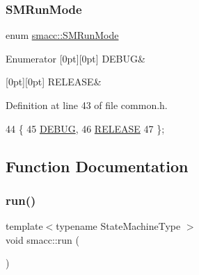 \subsubsection{\texorpdfstring{S\+M\+Run\+Mode}{SMRunMode}}
{\footnotesize\ttfamily enum \hyperlink{namespacesmacc_a3e4f79486ea6ea6342dd3c712d16a4f6}{smacc\+::\+S\+M\+Run\+Mode}\hspace{0.3cm}{\ttfamily [strong]}}

\begin{DoxyEnumFields}{Enumerator}
[0pt][0pt]{}\mbox{\label{namespacesmacc_a3e4f79486ea6ea6342dd3c712d16a4f6adc30ec20708ef7b0f641ef78b7880a15}} 
D\+E\+B\+UG&\\
\hline

[0pt][0pt]{}\mbox{\label{namespacesmacc_a3e4f79486ea6ea6342dd3c712d16a4f6a7d649ef069df9885e382417c79f3d5cd}} 
R\+E\+L\+E\+A\+SE&\\
\hline

\end{DoxyEnumFields}


Definition at line 43 of file common.\+h.


\begin{DoxyCode}
44 \{
45   \hyperlink{namespacesmacc_a3e4f79486ea6ea6342dd3c712d16a4f6adc30ec20708ef7b0f641ef78b7880a15}{DEBUG},
46   \hyperlink{namespacesmacc_a3e4f79486ea6ea6342dd3c712d16a4f6a7d649ef069df9885e382417c79f3d5cd}{RELEASE}
47 \};
\end{DoxyCode}


\subsection{Function Documentation}
\mbox{\label{namespacesmacc_a47ac3b8d2968b1ba4152afd64ab66bd0}} 
\subsubsection{\texorpdfstring{run()}{run()}}
{\footnotesize\ttfamily template$<$typename State\+Machine\+Type $>$ \\
void smacc\+::run (\begin{DoxyParamCaption}{ }\end{DoxyParamCaption})}



